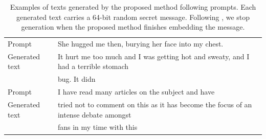 \documentclass[11pt]{article}
\begin{document}
\begin{table}[t]
\begin{tabular}{l|l}
\hline
Prompt & She hugged me then, burying her face into my chest. \\
Generated text & It hurt me too much and I was getting hot and sweaty, and I had a terrible stomach \\
&  bug. It didn \\
\hline
Prompt & I have read many articles on the subject and have \\
Generated text & tried not to comment on this as it has become the focus of an intense debate amongst \\
& fans in my time with this \\
\hline
\end{tabular}
\caption{Examples of texts generated by the proposed method following prompts.
Each generated text carries a 64-bit random secret message.
Following \citet{ziegler-etal-2019-neural}, we stop generation when the proposed method finishes embedding the message.
}
\label{tab:appendix-c}
\end{table}
\end{document}
